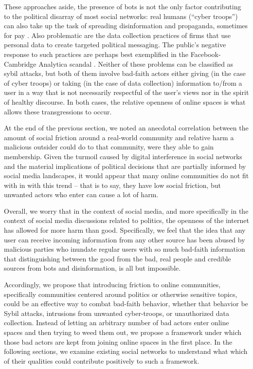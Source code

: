 \documentclass[sigconf,authordraft]{acmart}
\begin{document}
These approaches aside, the presence of bots is not the  only factor contributing to the political disarray of most social networks: real humans (``cyber troops'') can also take up the task of spreading disinformation and propaganda, sometimes for pay \cite{bradshaw2017troops}. Also problematic are the data collection practices of firms that use personal data to create targeted political messaging. The public's negative response to such practices are perhaps best exemplified in the Facebook-Cambridge Analytica scandal \cite{CambridgeAnalyticaNYT}. Neither of these problems can be classified as sybil attacks, but both of them involve bad-faith actors either giving (in the case of cyber troops) or taking (in the case of data collection) information to/from a user in a way that is not necessarily respectful of the user's views nor in the spirit of healthy discourse. In both cases, the relative openness of online spaces is what allows these transgressions to occur.

At the end of the previous section, we noted an anecdotal correlation between the amount of social friction around a real-world community and relative harm a malicious outsider could do to that community, were they able to gain membership. Given the turmoil caused by digital interference in social networks and the material implications of political decisions that are partially informed by social media landscapes, it would appear that many online communities do not fit with in with this trend -- that is to say, they have low social friction, but unwanted actors who enter can cause a lot of harm. 

Overall, we worry that in the context of social media, and more specifically in the context of social media discussions related to politics, the openness of the internet has allowed for more harm than good. Specifically, we feel that the idea that any user can receive incoming information from any other source has been abused by malicious parties who inundate regular users with so much bad-faith information that distinguishing between the good from the bad, real people and credible sources from bots and disinformation, is all but impossible.

Accordingly, we propose that introducing friction to online communities, specifically communities centered around politics or otherwise sensitive topics, could be an effective way to combat bad-faith behavior, whether that behavior be Sybil attacks, intrusions from unwanted cyber-troops, or unauthorized data collection. Instead of letting an arbitrary number of bad actors enter online spaces and then trying to weed them out, we propose a framework under which those bad actors are kept from joining online spaces in the first place. In the following sections, we examine existing social networks to understand what which of their qualities could contribute positively to such a framework.
\end{document}
